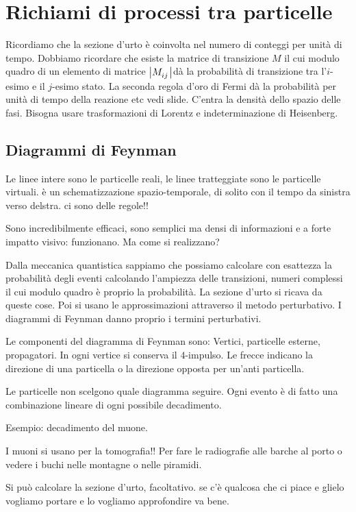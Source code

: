     \section{Richiami di processi tra particelle}
        Ricordiamo che la sezione d'urto è coinvolta nel numero di conteggi per unità di tempo. Dobbiamo ricordare che esiste la matrice di transizione $M$ il cui modulo quadro di un elemento di matrice $\abs{\tensor{M}{_{ij}}}$dà la probabilità di transizione tra l'$i$-esimo e il $j$-esimo stato. La seconda regola d'oro di Fermi dà la probabilità per unità di tempo della reazione etc vedi slide. C'entra la densità dello spazio delle fasi. Bisogna usare trasformazioni di Lorentz e indeterminazione di Heisenberg.

        \subsection{Diagrammi di Feynman}
            Le linee intere sono le particelle reali, le linee tratteggiate sono le particelle virtuali. è un schematizzazione spazio-temporale, di solito con il tempo da sinistra verso delstra. ci sono delle regole!!
             
            Sono incredibilmente efficaci, sono semplici ma densi di informazioni e a forte impatto visivo: funzionano. Ma come si realizzano?

            Dalla meccanica quantistica sappiamo che possiamo calcolare con esattezza la probabilità degli eventi calcolando l'ampiezza delle transizioni, numeri complessi il cui modulo quadro è proprio la probabilità. La sezione d'urto si ricava da queste cose. Poi si usano le approssimazioni attraverso il metodo perturbativo. I diagrammi di Feynman danno proprio i termini perturbativi.

            Le componenti del diagramma di Feynman sono: Vertici, particelle esterne, propagatori. In ogni vertice si conserva il $4$-impulso. Le frecce indicano la direzione di una particella o la direzione opposta per un'anti particella.

            Le particelle non scelgono quale diagramma seguire. Ogni evento è di fatto una combinazione lineare di ogni possibile decadimento.

            Esempio: decadimento del muone.

            I muoni si usano per la tomografia!! Per fare le radiografie alle barche al porto o vedere i buchi nelle montagne o nelle piramidi.

            Si può calcolare la sezione d'urto, facoltativo. se c'è qualcosa che ci piace e glielo vogliamo portare e lo vogliamo approfondire va bene.


